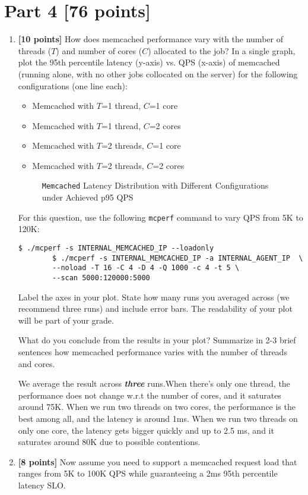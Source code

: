 \documentclass[11pt]{article}
\begin{document}
\newpage

\section*{Part 4 [76 points]}

\begin{enumerate}
    \itemsep 2em
    \item \textbf{[10 points]} How does memcached performance vary with the number of threads ($T$) and number of cores ($C$) allocated to the job? In a single graph, plot the 95th percentile latency (y-axis) vs. QPS (x-axis) of memcached (running alone, with no other jobs collocated on the server) for the following configurations (one line each):
    \begin{itemize}
        \item Memcached with $T$=1 thread, $C$=1 core
        \item Memcached with $T$=1 thread, $C$=2 cores
        \item Memcached with $T$=2 threads, $C$=1 core
        \item Memcached with $T$=2 threads, $C$=2 cores
    \end{itemize}
    \begin{figure}[!htbp]
      \centering
      
      \caption{\small{\texttt{Memcached} Latency Distribution with Different Configurations under Achieved p95 QPS}}
        \label{fig:1}
    \end{figure} 
    
    For this question, use the following \texttt{mcperf} command to vary QPS from 5K to 120K: 
    \begin{Verbatim}[fontsize=\small]
        $ ./mcperf -s INTERNAL_MEMCACHED_IP --loadonly 
        $ ./mcperf -s INTERNAL_MEMCACHED_IP -a INTERNAL_AGENT_IP  \
        --noload -T 16 -C 4 -D 4 -Q 1000 -c 4 -t 5 \ 
        --scan 5000:120000:5000
    \end{Verbatim}
    
    Label the axes in your plot. State how many runs you averaged across (we recommend three runs) and include error bars. The readability of your plot will be part of your grade.
    
    What do you conclude from the results in your plot? Summarize in 2-3 brief sentences how memcached performance varies with the number of threads and cores. 
    

    We average the result across \textbf{\emph{three}} runs.When there's only one thread, the performance does not change w.r.t the number of cores, and it saturates around 75K. When we run two threads on two cores, the performance is the best among all, and the latency is around 1ms. When we run two threads on only one core, the latency gets bigger quickly and up to 2.5 ms, and it saturates around 80K due to possible contentions.  
    \item \textbf{[8 points]} Now assume you need to support a memcached request load that ranges from 5K to 100K QPS while guaranteeing a 2ms 95th percentile latency SLO. \\
    

\end{enumerate}
\end{document}
